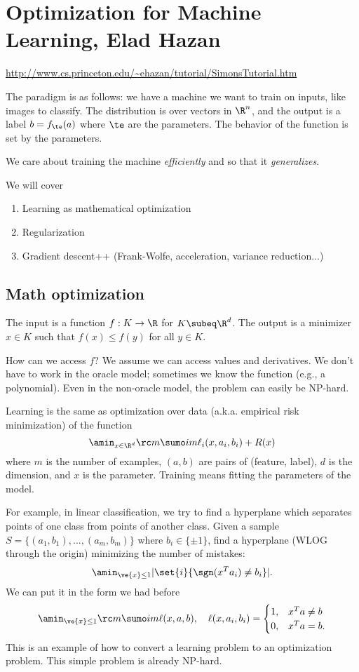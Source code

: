 \section{Optimization for Machine Learning, Elad Hazan}

\url{http://www.cs.princeton.edu/~ehazan/tutorial/SimonsTutorial.htm}

The paradigm is as follows: we have a machine we want to train on inputs, like images to classify. The distribution is over vectors in $\R^n$, and the output is a label $b=f_{\te}(a)$ where $\te$ are the parameters. 
The behavior of the function is set by the parameters.

We care about training the machine \emph{efficiently} and so that it \emph{generalizes}.

We will cover
\begin{enumerate}
\item
Learning as mathematical optimization
\item
Regularization
\item
Gradient descent++ (Frank-Wolfe, acceleration, variance reduction...)
\end{enumerate}

\subsection{Math optimization}

The input is a function $f:K\to \R$ for $K\subeq \R^d$.
The output is a minimizer $x\in K$ such that $f(x)\le f(y)$ for all $y\in K$.

How can we access $f$? We assume we can access values and derivatives. We don't have to work in the oracle model; sometimes we know the function (e.g., a polynomial). Even in the non-oracle model, %
the problem can easily be NP-hard.

Learning is the same as optimization over data (a.k.a. empirical risk minimization) of the function
$$
\amin_{x\in \R^d} \rc m \sumo im \ell_i(x,a_i,b_i) + R(x)
$$
where $m$ is the number of examples, $(a,b)$ are pairs of (feature, label), $d$ is the dimension, and $x$ is the parameter. Training means fitting the parameters of the model.

For example, in linear classification, we try to find a hyperplane which separates points of one class %
from points of another class. %
Given a sample $S=\{(a_1,b_1),\ldots, (a_m,b_m)\}$ where $b_i\in \{\pm 1\}$, find a hyperplane (WLOG through the origin) minimizing the number of mistakes:
$$
\amin_{\ve{x}\le 1} |\set{i}{\sgn(x^Ta_i)\ne b_i}|.
$$
We can put it in the form we had before
$$
\amin_{\ve{x}\le 1}\rc m \sumo im \ell(x,a,b),\quad 
\ell(x,a_i,b_i) = \begin{cases}
1,&x^Ta\ne b\\
0,&x^Ta=b.
\end{cases}
$$
This is an example of how to convert a learning problem to an optimization problem. This simple problem is already NP-hard.

